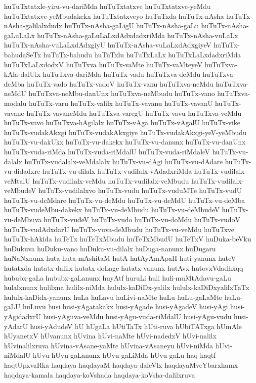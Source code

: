 {huTuTxtatxle-yiru-vu-dariMda
huTuTxtatxve
huTuTxtatxve-yeMdu
huTuTxtatxve-yeMbudakekx
huTuTxtatxveyo
huTuTxda
huTuTx-nAsha
huTuTx-nAsha-galilalxdudx
huTuTx-nAsha-gaLigU
huTuTx-nAsha-gaLu
huTuTx-nAsha-gaLuLaLx
huTuTx-nAsha-gaLuLaLxdAdxdadxriMda
huTuTx-nAsha-vuLaLx
huTuTx-nAsha-vuLaLxdAdxgiyU
huTuTx-nAsha-vuLaLxdAdxgiyeV
huTuTx-bahudaSeTx
huTuTx-bahudu
huTuTxlu
huTuTxLaLx
huTuTxLaLxdadxriMda
huTuTxLaLxdodxV
huTuTxva
huTuTx-vaMte
huTuTx-vaMteyeV
huTuTxva-kAla-dalUlx
huTuTxva-dariMda
huTuTx-vadu
huTuTxva-deMdu
huTuTxva-deMba
huTuTx-vado
huTuTx-vadoV
huTuTx-vanu
huTuTxva-neMdu
huTuTxva-neMdU
huTuTxva-neMbu-danUnx
huTuTxva-neMbudu
huTuTx-vano
huTuTxva-modalu
huTuTx-varu
huTuTx-valilx
huTuTx-vavanu
huTuTx-vavanU
huTuTx-vavane
huTuTx-vavaneMdu
huTuTxva-varegU
huTuTx-vavu
huTuTxva-veMdu
huTuTx-vavo
huTuTxva-hAgilalx
huTuTx-vAga
huTuTx-vAgalU
huTuTx-vike
huTuTx-vudakAkxgi
huTuTx-vudakAkxgiye
huTuTx-vudakAkxgi-yeV-yeMbudu
huTuTx-vu-dakUkx
huTuTx-vu-dakekx
huTuTx-vu-danunx
huTuTx-vu-danUnx
huTuTx-vuda-riMda
huTuTx-vuda-riMdalU
huTuTx-vuda-riMdaleV
huTuTx-vu-dalalx
huTuTx-vudalalx-veMdalalx
huTuTx-vu-dAgi
huTuTx-vu-dAdare
huTuTx-vu-didadxre
huTuTx-vu-dilalx
huTuTx-vudilalx-vAdadxriMda
huTuTx-vudilalx-veMtalU
huTuTx-vudilalx-veMdu
huTuTx-vudilalx-veMbudu
huTuTx-vudilalx-veMbudeV
huTuTx-vudilalxvo
huTuTx-vudu
huTuTx-vuduMTe
huTuTx-vudU
huTuTx-vu-deMdare
huTuTx-vu-deMdu
huTuTx-vu-deMdU
huTuTx-vu-deMba
huTuTx-vudeMbu-dakekx
huTuTx-vu-deMbudu
huTuTx-vu-deMbudeV
huTuTx-vu-deMbuva
huTuTx-vudeV
huTuTx-vudo
huTuTx-vu-doMdu
huTuTx-vudoV
huTuTx-vudAdxdarU
huTuTx-vuva-deMbudu
huTuTx-vu-veMdu
huTuTxve
huTuTx-hAkida
huTeTx
huTeTxMbudu
huTeTxMbudU
huTeTxV
huDuka-beVku
huDukuva
huDuku-vano
huDuku-vu-dilalx
huDuga-nanunx
huDugaru
huNaNxnunx
huta
huta-mAshitaM
hutA
hutAyAmApaH
huti-yanunx
huteV
hutatxda
hutatx-dalilx
hutatx-doLage
hutatx-vanunx
hutAvx
hutovxVdadhxqq
hububx-gaLa
hububx-gaLanunx
huyAtf
huruLi
huli
huli-muMtAdavu-gaLu
hulalxnunx
hulilxna
hulilx-niMda
hululx-kaDiDx-yalilx
hululx-kaDiDxyalilxTaTx
hululx-kaDidx-yanunx
huLa
huLavu
huLivi-naMte
huLu
huLu-gaLaMte
huLu-gaLU
huLuvu
husi
husi-yAgatakakx
husi-yAgade
husi-yAgadeV
husi-yAgi
husi-yAgidadxrU
husi-yAguva-veMdu
husi-yAgu-vuda-riMdalU
husi-yAgu-vudu
husi-yAdarU
husi-yAdudeV
hU
hUgaLa
hUtiTaTx
hUti-ruva
hUbiTATxga
hUmAle
hUyanetxV
hUvanunx
hUvina
hUvi-naMte
hUvi-nadedxV
hUvi-nalilx
hUvinalilxruva
hUvina-vAsane-yaMte
hUvina-vAsaneyu
hUvi-niMda
hUvi-niMdalU
hUvu
hUvu-gaLanunx
hUvu-gaLiMda
hUvu-gaLu
haq
haqtf
haqtUpxvaRka
haqdaya
haqdayaM
haqdaya-daleVlx
haqdayaMveYbarxhamx
haqdaya-kamala
haqdaya-koVshada
haqdaya-koVsha-dalilxruva
}

